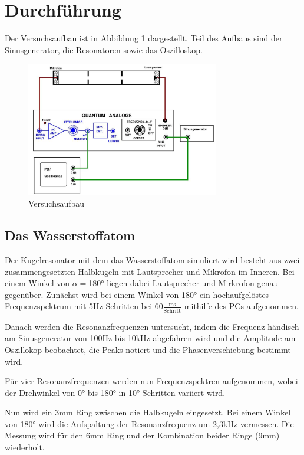 \section{Durchführung}

\noindent
Der Versuchsaufbau ist in Abbildung \ref{fig:aufbau} dargestellt.
Teil des Aufbaus sind der Sinusgenerator, die Resonatoren sowie das Oszilloskop.

\begin{figure}
  \centering
  \includegraphics[width=0.75\textwidth]{V23_aufbau.png}
  \caption{Versuchsaufbau \cite{V23}}
  \label{fig:aufbau}
\end{figure}


\subsection{Das Wasserstoffatom}
\label{Wasserstoffatom}
\noindent
Der Kugelresonator mit dem das Wasserstoffatom simuliert wird besteht aus zwei zusammengesetzten Halbkugeln mit Lautsprecher und Mikrofon im Inneren.
Bei einem Winkel von $\alpha=$180° liegen dabei Lautsprecher und Mirkrofon genau gegenüber.
Zunächst wird bei einem Winkel von 180° ein hochaufgelöstes Frequenzspektrum mit 5Hz-Schritten bei $60\frac{\text{ms}}{\text{Schritt}}$ mithilfe des PCs aufgenommen.

\noindent
Danach werden die Resonanzfrequenzen untersucht, indem die Frequenz händisch am Sinusgenerator von 100Hz bis 10kHz abgefahren wird und die Amplitude am Oszillokop beobachtet, 
die Peaks notiert und die Phasenverschiebung bestimmt wird.

\noindent
Für vier Resonanzfrequenzen werden nun Frequenzspektren aufgenommen, wobei der Drehwinkel von 0° bis 180° in 10° Schritten variiert wird.

\noindent
Nun wird ein 3mm Ring zwischen die Halbkugeln eingesetzt.
Bei einem Winkel von 180° wird die Aufspaltung der Resonanzfrequenz um 2,3kHz vermessen.
Die Messung wird für den 6mm Ring und der Kombination beider Ringe (9mm) wiederholt.

